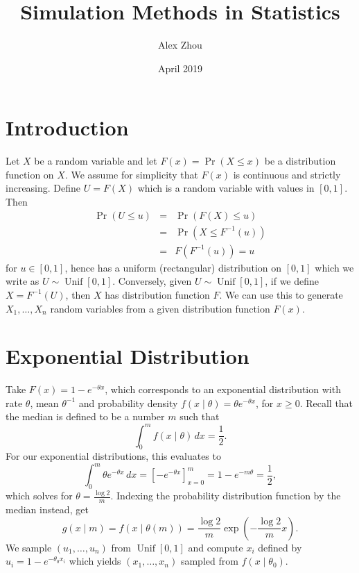 \documentclass{article}
\title{Simulation Methods in Statistics}
\author{Alex Zhou}
\date{April 2019}
\newcommand{\pr}{\mathop{\mathrm{Pr}}}
\begin{document}
\maketitle

\section{Introduction}

Let \(X\) be a random variable and let \(F(x) = \pr(X \leq x)\) be a distribution function on \(X\). We assume for simplicity that \(F(x)\) is continuous and strictly increasing. Define \(U = F(X)\) which is a random variable with values in \([0,1]\). Then
\begin{eqnarray*}
    \pr(U \leq u) & = & \pr(F(X) \leq u) \\
                 & = & \pr(X \leq F^{-1}(u)) \\
                 & = & F(F^{-1}(u)) = u
\end{eqnarray*}
for \(u \in [0,1]\), hence has a uniform (rectangular) distribution on \([0,1]\) which we write as \(U \sim \mathop{\mathrm{Unif}}[0,1]\). Conversely, given \(U \sim \mathop{\mathrm{Unif}}[0,1] \), if we define \(X = F^{-1}(U)\), then \(X\) has distribution function \(F\). We can use this to generate \(X_1, \dots, X_n\) random variables from a given distribution function \(F(x)\).

\section{Exponential Distribution}

Take \(F(x) = 1 - e^{-\theta x}\), which corresponds to an exponential distribution with rate \(\theta\), mean \(\theta^{-1}\) and probability density \(f(x \mid \theta) = \theta e^{-\theta x}\), for \(x \geq 0\). Recall that the median is defined to be a number \(m\) such that
\[ \int_0^m f(x \mid \theta) \,dx = \frac{1}{2}. \]
For our exponential distributions, this evaluates to
\[ \int_0^m \theta e^{-\theta x} \,dx = [-e^{-\theta x}]^m_{x=0} = 1 - e^{-m\theta} = \frac{1}{2}, \]
which solves for \(\theta = \frac{\log 2}{m}\). Indexing the probability distribution function by the median instead, get
\[ g(x \mid m)= f(x \mid \theta(m)) = \frac{\log2}{m}\exp\left(-\frac{\log2}{m}x\right). \]
We sample \((u_1,\dots,u_n)\) from \(\mathop{\mathrm{Unif}}[0,1]\) and compute \(x_i\) defined by \(u_i = 1 - e^{-\theta_0 x_i}\) which yields \((x_1,\dots,x_n)\) sampled from \(f(x \mid \theta_0)\). 
\end{document}
